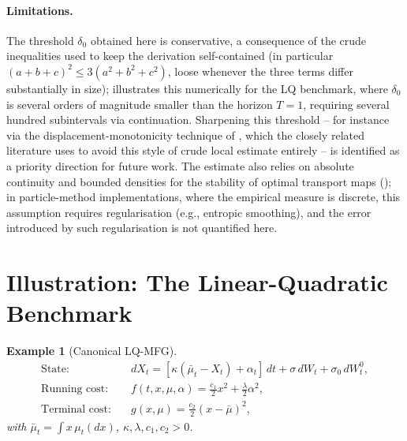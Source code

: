 \documentclass[11pt]{article}
\newtheorem{example}[theorem]{Example}
\theoremstyle{remark}
\begin{document}
\paragraph{Limitations.} The threshold $\delta_0$ obtained here is conservative, a
consequence of the crude inequalities used to keep the derivation self-contained
(in particular $(a+b+c)^2\le 3(a^2+b^2+c^2)$, loose whenever the three terms differ
substantially in size);  illustrates this numerically
for the LQ benchmark, where $\delta_0$ is several orders of magnitude smaller than
the horizon $T=1$, requiring several hundred subintervals via continuation.
Sharpening this threshold -- for instance via the displacement-monotonicity
technique of \citet{jacksontangpi2024,jacksonmeszaros2025}, which the closely
related literature uses to avoid this style of crude local estimate entirely -- is
identified as a priority direction for future work. The estimate also relies on
absolute continuity and bounded densities for the stability of optimal transport
maps (); in particle-method implementations, where the
empirical measure is discrete, this assumption requires regularisation (e.g.,
entropic smoothing), and the error introduced by such regularisation is not
quantified here.

\section{Illustration: The Linear-Quadratic Benchmark}
\label{sec:example}

\begin{example}[Canonical LQ-MFG]
\label{ex:lq-mfg}
\begin{align*}
    \text{State:}\quad & dX_t = [\kappa(\bar\mu_t - X_t) + \alpha_t]\, dt + \sigma\,
        dW_t + \sigma_0\, dW_t^0, \\
    \text{Running cost:}\quad & f(t,x,\mu,\alpha) = \tfrac{c_1}{2}x^2 +
        \tfrac{\lambda}{2}\alpha^2, \\
    \text{Terminal cost:}\quad & g(x,\mu) = \tfrac{c_2}{2}(x-\bar\mu)^2,
\end{align*}
with $\bar\mu_t = \int x\,\mu_t(dx)$, $\kappa, \lambda, c_1, c_2 > 0$.
\end{example}
\end{document}
